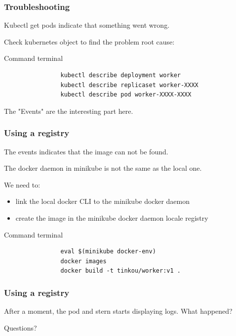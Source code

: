 	\begin{frame}[fragile]
		\frametitle{Troubleshooting}
		
		Kubectl get pods indicate that something went wrong.
		
		Check kubernetes object to find the problem root cause:
		\begin{block}{Command terminal}
			\begin{verbatim}
				kubectl	describe deployment worker
				kubectl describe replicaset worker-XXXX
				kubectl describe pod worker-XXXX-XXXX
			\end{verbatim}
		\end{block}
		
		The "Events" are the interesting part here.
		
	\end{frame}
	
	\begin{frame}[fragile]
		\frametitle{Using a registry}
		
		The events indicates that the image can not be found.
		
		\medskip
		
		The docker daemon in minikube is not the same as the local one.
		
		\medskip 
		We need to:
		\begin{itemize}
			\item link the local docker CLI to the minikube docker daemon
			\item create the image in the minikube docker daemon locale registry
		\end{itemize}
		
		\begin{block}{Command terminal}
			\begin{verbatim}
				eval $(minikube docker-env)
				docker images
				docker build -t tinkou/worker:v1 .
			\end{verbatim}
		\end{block}

	\end{frame}
	
	\begin{frame}[fragile]
		\frametitle{Using a registry}
	
		After a moment, the pod and stern starts displaying logs. What happened?
		
		\bigskip
		
	
	\end{frame}


	\begin{frame}
		\begin{center}
			Questions?
		\end{center}
	\end{frame}